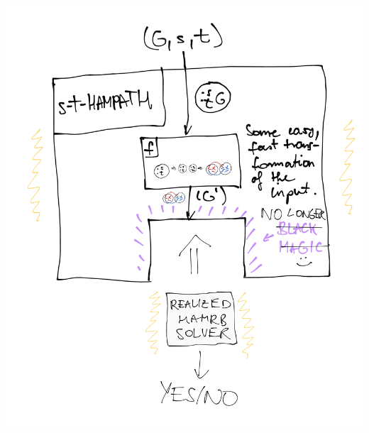 \begin{center}
\includegraphics[width=0.9\linewidth]{./exams/2022_05_30/03/karp_insert.png}
\end{center}